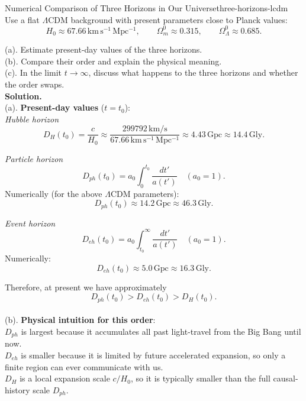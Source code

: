 \clearpage
\begin{example}{Numerical Comparison of Three Horizons in Our Universe}{three-horizons-lcdm}
    Use a flat $\Lambda$CDM background with present parameters close to Planck values:
    \[
        H_0\approx 67.66\,\mathrm{km\,s^{-1}\,Mpc^{-1}},\qquad
        \Omega_m^0\approx 0.315,\qquad
        \Omega_\Lambda^0\approx 0.685.
    \]

    (a). Estimate present-day values of the three horizons. \\
    (b). Compare their order and explain the physical meaning. \\
    (c). In the limit $t\to\infty$, discuss what happens to the three horizons and whether the order swaps. \\

    \bigskip\textbf{Solution.}\quad \\
    (a). \textbf{Present-day values} ($t=t_0$): \\
    \textit{Hubble horizon}
    \[
        D_H(t_0)=\frac{c}{H_0}
        \approx \frac{299792\,\mathrm{km/s}}{67.66\,\mathrm{km\,s^{-1}\,Mpc^{-1}}}
        \approx 4.43\,\mathrm{Gpc}
        \approx 14.4\,\mathrm{Gly}.
    \]

    \textit{Particle horizon}
    \[
        D_{ph}(t_0)=a_0\int_0^{t_0}\frac{dt'}{a(t')}
        \quad (a_0=1).
    \]
    Numerically (for the above $\Lambda$CDM parameters):
    \[
        D_{ph}(t_0)\approx 14.2\,\mathrm{Gpc}\approx 46.3\,\mathrm{Gly}.
    \]

    \textit{Event horizon}
    \[
        D_{eh}(t_0)=a_0\int_{t_0}^{\infty}\frac{dt'}{a(t')}
        \quad (a_0=1).
    \]
    Numerically:
    \[
        D_{eh}(t_0)\approx 5.0\,\mathrm{Gpc}\approx 16.3\,\mathrm{Gly}.
    \]

    Therefore, at present we have approximately
    \[
        D_{ph}(t_0) > D_{eh}(t_0) > D_H(t_0).
    \] \\

    (b). \textbf{Physical intuition for this order}: \\
    $D_{ph}$ is largest because it accumulates all past light-travel from the Big Bang until now. \\
    $D_{eh}$ is smaller because it is limited by future accelerated expansion, so only a finite region can ever communicate with us. \\
    $D_H$ is a local expansion scale $c/H_0$, so it is typically smaller than the full causal-history scale $D_{ph}$. \\


\end{example}
